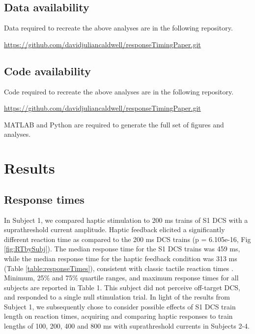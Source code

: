  
\subsection{Data availability}
 

 Data required to recreate the above analyses are in the following repository. 
 
 \url{https://github.com/davidjuliancaldwell/responseTimingPaper.git}
 
\subsection{Code availability}
 
 
 Code required to recreate the above analyses are in the following repository.
  
  \url{https://github.com/davidjuliancaldwell/responseTimingPaper.git}

 MATLAB and Python are required to generate the full set of figures and analyses.  
 

\section{Results}

\subsection{Response times}

In Subject 1, we compared haptic stimulation to 200 ms trains of S1 DCS with a suprathreshold current amplitude. Haptic feedback elicited a significantly different reaction time as compared to the 200 ms DCS trains (p = 6.105e-16, Fig \ref{fig:RTbySubj}). The median response time for the S1 DCS trains was 459 ms, while the median response time for the haptic feedback condition was 313 ms (Table \ref{table:responseTimes}), consistent with classic tactile reaction times \cite{Lele1954a,Woodworth1954a}. Minimum, 25\% and 75\% quartile ranges, and maximum response times for all subjects are reported in Table 1. This subject did not perceive off-target DCS, and responded to a single null stimulation trial. In light of the results from Subject 1, we subsequently chose to consider possible effects of S1 DCS train length on reaction times, acquiring and comparing haptic responses to train lengths of 100, 200, 400 and 800 ms with suprathreshold currents in Subjects 2-4.

